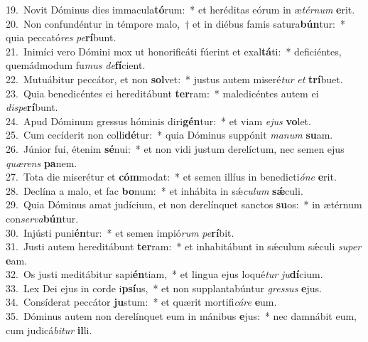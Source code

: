 {19.~}Novit Dóminus dies immacula\textbf{tó}rum:~* et heréditas eórum in æ\textit{tér}\textit{num} \textbf{e}rit.\\
{20.~}Non confundéntur in témpore malo,~† et in diébus famis satura\textbf{bún}tur:~* quia peccató\textit{res} \textit{pe}\textbf{rí}bunt.\\
{21.~}Inimíci vero Dómini mox ut honorificáti fúerint et exal\textbf{tá}ti:~* deficiéntes, quemádmodum fu\textit{mus} \textit{de}\textbf{fí}cient.\\
{22.~}Mutuábitur peccátor, et non \textbf{sol}vet:~* justus autem miseré\textit{tur} \textit{et} \textbf{trí}buet.\\
{23.~}Quia benedicéntes ei hereditábunt \textbf{ter}ram:~* maledicéntes autem ei \textit{di}\textit{spe}\textbf{rí}bunt.\\
{24.~}Apud Dóminum gressus hóminis diri\textbf{gén}tur:~* et viam \textit{e}\textit{jus} \textbf{vo}let.\\
{25.~}Cum cecíderit non colli\textbf{dé}tur:~* quia Dóminus suppónit \textit{ma}\textit{num} \textbf{su}am.\\
{26.~}Júnior fui, étenim \textbf{sé}nui:~* et non vidi justum derelíctum, nec semen ejus \textit{quæ}\textit{rens} \textbf{pa}nem.\\
{27.~}Tota die miserétur et \textbf{cóm}modat:~* et semen illíus in benedicti\textit{ó}\textit{ne} \textbf{e}rit.\\
{28.~}Declína a malo, et fac \textbf{bo}num:~* et inhábita in sǽ\textit{cu}\textit{lum} \textbf{sǽ}culi.\\
{29.~}Quia Dóminus amat judícium, et non derelínquet sanctos \textbf{su}os:~* in ætérnum con\textit{ser}\textit{va}\textbf{bún}tur.\\
{30.~}Injústi puni\textbf{én}tur:~* et semen impió\textit{rum} \textit{pe}\textbf{rí}bit.\\
{31.~}Justi autem hereditábunt \textbf{ter}ram:~* et inhabitábunt in sǽculum sǽculi \textit{su}\textit{per} \textbf{e}am.\\
{32.~}Os justi meditábitur sapi\textbf{én}tiam,~* et lingua ejus loqué\textit{tur} \textit{ju}\textbf{dí}cium.\\
{33.~}Lex Dei ejus in corde i\textbf{psí}us,~* et non supplantabúntur \textit{gres}\textit{sus} \textbf{e}jus.\\
{34.~}Consíderat peccátor \textbf{ju}stum:~* et quærit mortifi\textit{cá}\textit{re} \textbf{e}um.\\
{35.~}Dóminus autem non derelínquet eum in mánibus \textbf{e}jus:~* nec damnábit eum, cum judicá\textit{bi}\textit{tur} \textbf{il}li.\\
